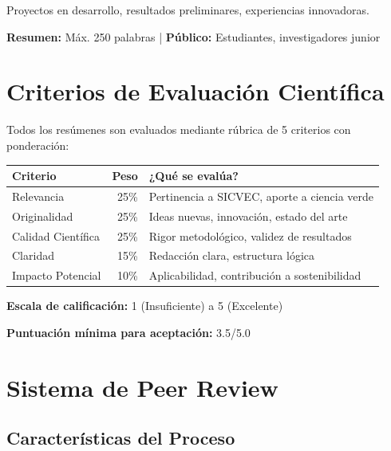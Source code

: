 \documentclass[12pt,a4paper]{article}
\begin{document}
Proyectos en desarrollo, resultados preliminares, experiencias innovadoras.

\textbf{Resumen:} Máx. 250 palabras | \textbf{Público:} Estudiantes, investigadores junior

\section{Criterios de Evaluación Científica}

Todos los resúmenes son evaluados mediante rúbrica de 5 criterios con ponderación:

\begin{table}[H]
\centering
\begin{tabular}{|l|r|l|}
\hline
\rowcolor{verdeclaro}
\textbf{Criterio} & \textbf{Peso} & \textbf{¿Qué se evalúa?} \\
\hline
Relevancia & 25\% & Pertinencia a SICVEC, aporte a ciencia verde \\
\hline
Originalidad & 25\% & Ideas nuevas, innovación, estado del arte \\
\hline
Calidad Científica & 25\% & Rigor metodológico, validez de resultados \\
\hline
Claridad & 15\% & Redacción clara, estructura lógica \\
\hline
Impacto Potencial & 10\% & Aplicabilidad, contribución a sostenibilidad \\
\hline
\end{tabular}
\end{table}

\textbf{Escala de calificación:} 1 (Insuficiente) a 5 (Excelente)

\textbf{Puntuación mínima para aceptación:} 3.5/5.0

\section{Sistema de Peer Review}

\subsection{Características del Proceso}
\end{document}
